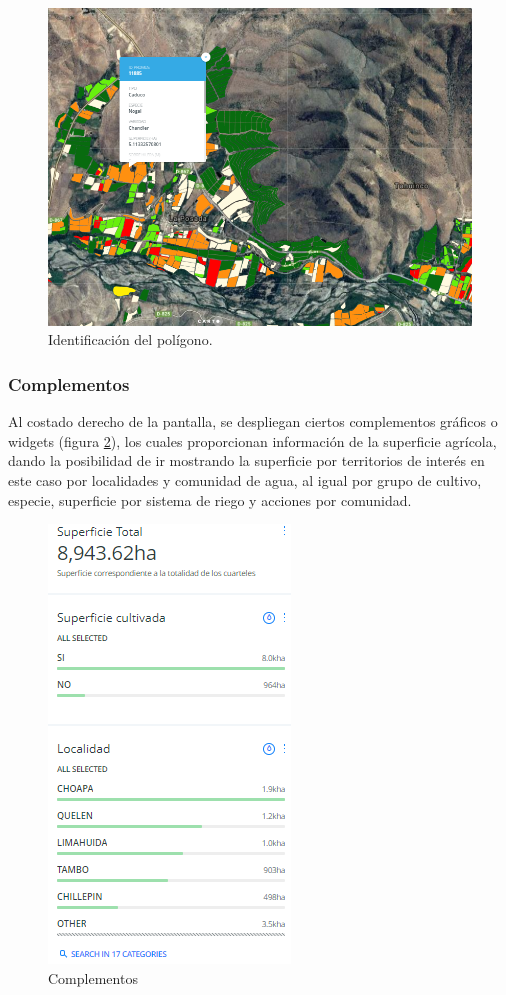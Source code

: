 \documentclass[10pt]{article}
\begin{document}
\begin{figure}[H]
\centering
\includegraphics[scale=0.5]{Figuras_manual/visor_popup.png}
\caption{Identificación del polígono.}
\label{4}
\end{figure}

\subsubsection{Complementos}

Al costado derecho de la pantalla, se despliegan ciertos complementos gráficos o widgets (figura \ref{5}), los cuales proporcionan información de la superficie agrícola, dando la posibilidad de ir mostrando la superficie por territorios de interés en este caso por localidades y comunidad de agua, al igual por grupo de cultivo, especie, superficie por sistema de riego y acciones por comunidad.

\begin{figure}[H]
\centering
\includegraphics[scale=0.5]{Figuras_manual/widget_3.png}
\caption{Complementos}
\label{5}
\end{figure}
\end{document}
